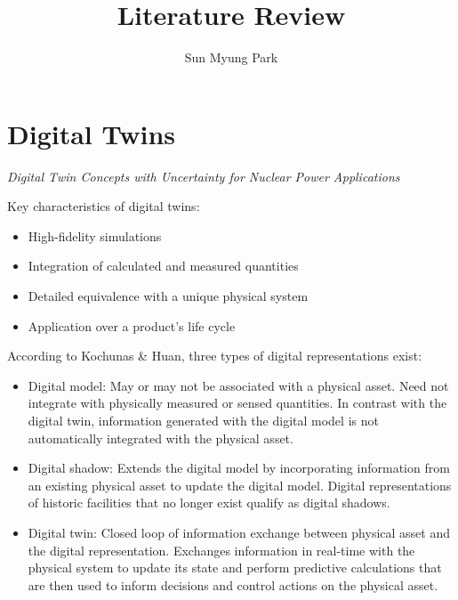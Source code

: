 \documentclass[letterpage,11pt]{article}
\begin{document}
\title{Literature Review}
\author{Sun Myung Park}

\maketitle

{
  \hypersetup{linkcolor=black}
  \tableofcontents
}
\pagebreak

\section{Digital Twins}

\textit{Digital Twin Concepts with Uncertainty for Nuclear Power Applications}
\cite{kochunas_digital_2021}

Key characteristics of digital twins:
%
\begin{itemize}
  \item High-fidelity simulations
  \item Integration of calculated and measured quantities
  \item Detailed equivalence with a unique physical system
  \item Application over a product's life cycle
\end{itemize}

According to Kochunas \& Huan, three types of digital representations exist:
%
\begin{itemize}
  \item Digital model: May or may not be associated with a physical asset. Need not integrate with
    physically measured or sensed quantities. In contrast with the digital twin, information
    generated with the digital model is not automatically integrated with the physical asset.
  \item Digital shadow: Extends the digital model by incorporating information from an existing
    physical asset to update the digital model. Digital representations of historic facilities that
    no longer exist qualify as digital shadows.
  \item Digital twin: Closed loop of information exchange between physical asset and the digital
    representation. Exchanges information in real-time with the physical system to update its state
    and perform predictive calculations that are then used to inform decisions and control actions
    on the physical asset.
\end{itemize}
\end{document}
